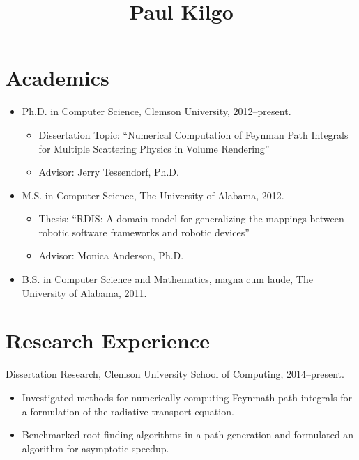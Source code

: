 \documentclass[12pt]{memoir}
\title{Paul Kilgo}
\date{}
\begin{document}
\maketitle

\section*{Academics}

\begin{itemize}[leftmargin=*]
  \item Ph.D. in Computer Science, Clemson University, 2012--present.
  \begin{itemize}
    \item Dissertation Topic:
          ``Numerical Computation of Feynman Path Integrals for Multiple
            Scattering Physics in Volume Rendering''
    \item Advisor: Jerry Tessendorf, Ph.D.
  \end{itemize}

  \item M.S. in Computer Science, The University of Alabama, 2012.
  \begin{itemize}
    \item Thesis: ``RDIS: A domain model for generalizing the mappings between
                    robotic software frameworks and robotic devices''
    \item Advisor: Monica Anderson, Ph.D.
  \end{itemize}

  \item B.S. in Computer Science and Mathematics, magna cum laude, The
        University of Alabama, 2011.
\end{itemize}

\section*{Research Experience}

Dissertation Research, Clemson University School of Computing, 2014--present.

\begin{itemize}
  \item Investigated methods for numerically computing Feynmath path integrals
        for a formulation of the radiative transport equation.
  \item Benchmarked root-finding algorithms in a path generation and formulated
        an algorithm for asymptotic speedup.
\end{itemize}
\end{document}
